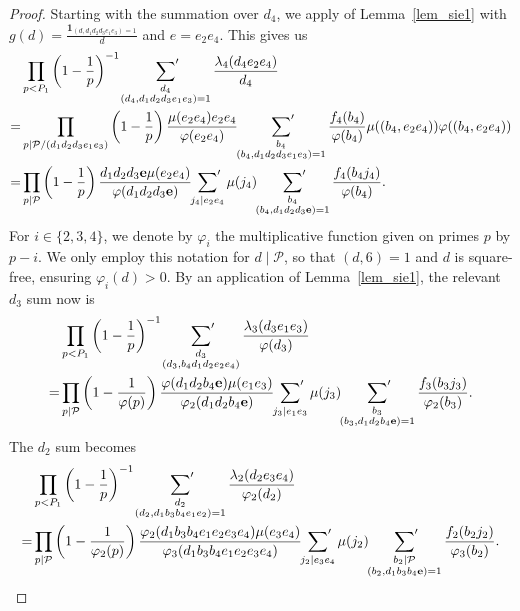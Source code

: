 \documentclass[12pt]{amsart}
\theoremstyle{definition}
\theoremstyle{remark}
\numberwithin{equation}{section}
\newcommand{\1}{\mathbf{1}}
\begin{document}
\begin{proof}
    Starting with the summation over $d_4$, we apply of Lemma~\ref{lem_sie1} with $g(d)=\frac{\1_{(d,d_1d_2d_3e_1 e_3)=1}}{d}$ and $e=e_2 e_4$. This gives us
	\begin{align*}
		& \prod_{p<P_1}\left(1-\frac{1}{p}\right)^{-1}\sideset{}{'}\sum_{\substack{d_4 \\ (d_4,d_1 d_2 d_3 e_1 e_3)=1}} \frac{\lambda_4(d_4e_2e_4)}{d_4} \\
		=& \prod_{p\mid \mathcal{P}/(d_1d_2d_3e_1e_3)}\left(1-\frac{1}{p}\right) \frac{\mu(e_2 e_4) e_2 e_4}{\varphi(e_2 e_4)}  \sideset{}{'}\sum_{\substack{b_4\\ (b_4,d_1 d_2 d_3e_1e_3)=1}}\frac{f_4(b_4)}{\varphi(b_4)} \mu((b_4,e_2 e_4))\varphi((b_4,e_2 e_4))\\
		=&\prod_{p\mid \mathcal{P}}\left(1-\frac{1}{p}\right) \frac{d_1 d_2 d_3 \mathbf{e} \mu(e_2 e_4) }{\varphi(d_1d_2d_3 \mathbf{e})}\sideset{}{'}\sum_{j_4\mid e_2e_4}\mu(j_4)\sideset{}{'}\sum_{\substack{b_4\\ (b_4,d_1d_2d_3\mathbf{e})=1}} \frac{f_4(b_4j_4)}{\varphi(b_4)}.
	\end{align*}
   For $i\in \{2,3,4\}$, we denote by $\varphi_i$ the multiplicative function given on primes $p$ by $p-i$. We only employ this notation for $d\mid \mathcal{P}$, so that $(d,6)=1$ and $d$ is square-free, ensuring $\varphi_i(d)>0$. By an application of Lemma~\ref{lem_sie1}, the relevant $d_3$ sum now is
	\begin{align*}
		&\prod_{p<P_1}\left(1-\frac{1}{p}\right)^{-1}\sideset{}{'}\sum_{\substack{d_3 \\ (d_3,b_4 d_1d_2  e_2 e_4)}}\frac{\lambda_3(d_3e_1e_3)}{\varphi(d_3)}\\
		=&\prod_{p\mid \mathcal{P}}\left(1-\frac{1}{\varphi(p)}\right) \frac{\varphi(d_1 d_2 b_4 \mathbf{e})\mu(e_1 e_3) }{\varphi_2(d_1d_2b_4\mathbf{e})} \sideset{}{'}\sum_{j_3\mid e_1e_3}\mu(j_3)\sideset{}{'}\sum_{\substack{b_3\\ (b_3,d_1 d_2 b_4 \mathbf{e})=1}}\frac{f_3(b_3j_3)}{\varphi_2(b_3)}.
		\end{align*}
	The $d_2$ sum becomes 
	\begin{align*}
		& \prod_{p<P_1}\left(1-\frac{1}{p}\right)^{-1}\sideset{}{'}\sum_{\substack{d_2 \\ (d_2,d_1b_3 b_4 e_1e_2)=1}} \frac{\lambda_2(d_2e_3e_4)}{\varphi_2(d_2)} \\
		=&\prod_{p\mid \mathcal{P}}\left(1-\frac{1}{\varphi_2(p)}\right) \frac{\varphi_2(d_1b_3b_4e_1e_2e_3e_4)\mu(e_3 e_4) }{\varphi_3(d_1b_3b_4e_1e_2e_3e_4)} \sideset{}{'}\sum_{j_2\mid e_3e_4}\mu(j_2) \sideset{}{'}\sum_{\substack{b_2\mid \mathcal{P}\\ (b_2,d_1 b_3 b_4\mathbf{e})=1}}\frac{f_2(b_2j_2)}{\varphi_3(b_2)}.

\end{align*}
\end{proof}
\end{document}
